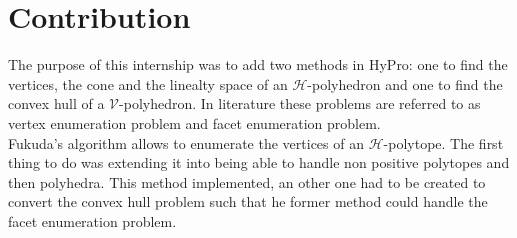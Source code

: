 \section{Contribution}
\label{section_contrib}
The purpose of this internship was to add two methods in HyPro: one to find the vertices, the cone and the linealty space of an $\mathcal{H}$-polyhedron and one to find the convex hull of a $\mathcal{V}$-polyhedron. In literature these problems are referred to as vertex enumeration problem and facet enumeration problem.\\
Fukuda's algorithm allows to enumerate the vertices of an $\mathcal{H}$-polytope. The first thing to do was extending it into being able to handle non positive polytopes and then polyhedra. This method implemented, an other one had to be created to convert the convex hull problem such that he former method could handle the facet enumeration problem.


